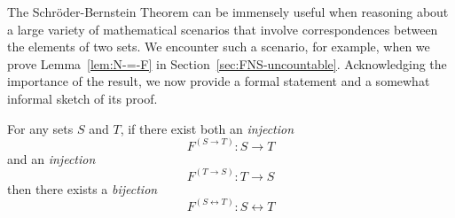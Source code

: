 \smallskip 

The Schr\"{o}der-Bernstein Theorem can be immensely useful when reasoning about a large variety of mathematical scenarios that involve correspondences between the elements of two sets.  We encounter such a scenario, for example, when we prove Lemma~\ref{lem:N-=-F} in Section~\ref{sec:FNS-uncountable}.  Acknowledging the importance of the result, we now provide a formal statement and a somewhat informal sketch of its proof.

\begin{theorem}
\label{thm.S-B}
For any sets $S$ and $T$, if there exist both an {\em injection}
\[ F^{(S \rightarrow T)}: S \rightarrow T \]
and an {\em injection}
\[ F^{(T \rightarrow S)}: T \rightarrow S \]
then there exists a {\em bijection}
\[ F^{(S \leftrightarrow T)}: S \leftrightarrow T \]
\end{theorem}


